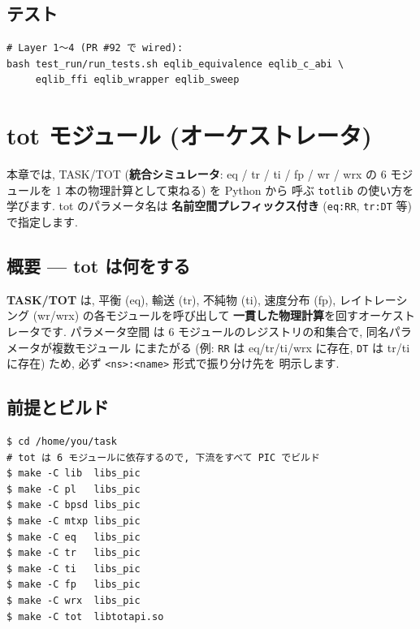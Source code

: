 \documentclass[11pt,a4paper]{report}
\begin{document}
\section{テスト}

\begin{lstlisting}[style=bash]
# Layer 1〜4 (PR #92 で wired):
bash test_run/run_tests.sh eqlib_equivalence eqlib_c_abi \
     eqlib_ffi eqlib_wrapper eqlib_sweep
\end{lstlisting}

\clearpage
\chapter{tot モジュール (オーケストレータ)}
\label{ch:tot}

\begin{learn}
本章では, TASK/TOT (\textbf{統合シミュレータ}: eq / tr / ti / fp /
wr / wrx の 6 モジュールを 1 本の物理計算として束ねる) を Python から
呼ぶ \texttt{totlib} の使い方を学びます. tot のパラメータ名は
\textbf{名前空間プレフィックス付き} (\texttt{eq:RR}, \texttt{tr:DT}
等) で指定します.
\end{learn}

\section{概要 — tot は何をする}

\textbf{TASK/TOT} は, 平衡 (eq), 輸送 (tr), 不純物 (ti), 速度分布
(fp), レイトレーシング (wr/wrx) の各モジュールを呼び出して
\textbf{一貫した物理計算}を回すオーケストレータです. パラメータ空間
は 6 モジュールのレジストリの和集合で, 同名パラメータが複数モジュール
にまたがる (例: \texttt{RR} は eq/tr/ti/wrx に存在, \texttt{DT} は
tr/ti に存在) ため, 必ず \texttt{<ns>:<name>} 形式で振り分け先を
明示します.

\section{前提とビルド}

\begin{lstlisting}[style=bash,caption={tot モジュールのライブラリビルド}]
$ cd /home/you/task
# tot は 6 モジュールに依存するので, 下流をすべて PIC でビルド
$ make -C lib  libs_pic
$ make -C pl   libs_pic
$ make -C bpsd libs_pic
$ make -C mtxp libs_pic
$ make -C eq   libs_pic
$ make -C tr   libs_pic
$ make -C ti   libs_pic
$ make -C fp   libs_pic
$ make -C wrx  libs_pic
$ make -C tot  libtotapi.so
\end{lstlisting}
\end{document}
